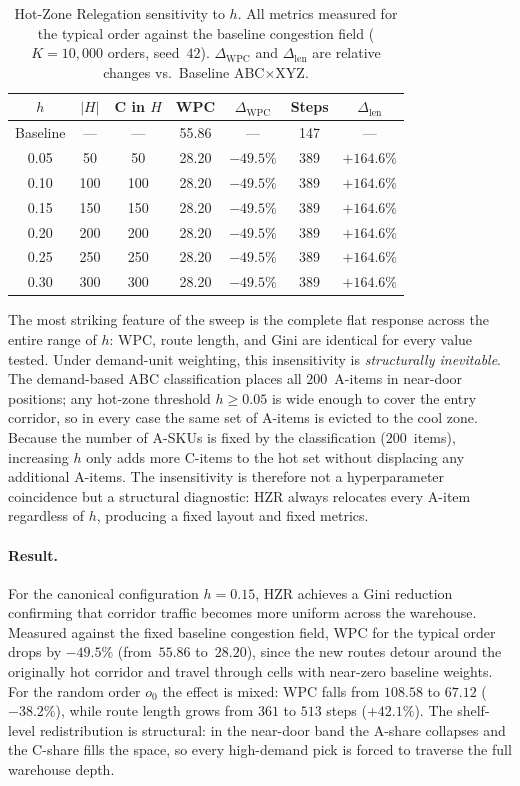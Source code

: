 \documentclass[12pt,a4paper]{article}
\begin{document}
\begin{table}[H]
\centering
\caption{Hot-Zone Relegation sensitivity to $h$.
  All metrics measured for the typical order against the baseline congestion field
  ($K=10{,}000$ orders, seed~$42$).
  $\Delta_\mathrm{WPC}$ and $\Delta_\mathrm{len}$ are relative changes vs.\ Baseline
  ABC$\times$XYZ.}
\label{tab:hzr_sweep}
\renewcommand{\arraystretch}{1.20}
\begin{tabular}{ccccccc}
\hline
$h$ & $|H|$ & C in $H$ & WPC & $\Delta_\mathrm{WPC}$ & Steps & $\Delta_\mathrm{len}$ \\
\hline
Baseline & ---   & ---  & 55.86 & ---         & 147 & ---        \\
0.05     & 50    & 50   & 28.20 & $-49.5\%$   & 389 & $+164.6\%$ \\
0.10     & 100   & 100  & 28.20 & $-49.5\%$   & 389 & $+164.6\%$ \\
0.15     & 150   & 150  & 28.20 & $-49.5\%$   & 389 & $+164.6\%$ \\
0.20     & 200   & 200  & 28.20 & $-49.5\%$   & 389 & $+164.6\%$ \\
0.25     & 250   & 250  & 28.20 & $-49.5\%$   & 389 & $+164.6\%$ \\
0.30     & 300   & 300  & 28.20 & $-49.5\%$   & 389 & $+164.6\%$ \\
\hline
\end{tabular}
\end{table}

The most striking feature of the sweep is the complete flat response across the
entire range of $h$: WPC, route length, and Gini are identical for every value tested.
Under demand-unit weighting, this insensitivity is \emph{structurally inevitable}.
The demand-based ABC classification places all $200$~A-items in near-door positions;
any hot-zone threshold $h \ge 0.05$ is wide enough to cover the entry corridor,
so in every case the same set of A-items is evicted to the cool zone.
Because the number of A-SKUs is fixed by the classification ($200$~items),
increasing $h$ only adds more C-items to the hot set without displacing any
additional A-items.
The insensitivity is therefore not a hyperparameter coincidence but a structural
diagnostic: HZR always relocates every A-item regardless of $h$, producing a
fixed layout and fixed metrics.

\paragraph{Result.}
For the canonical configuration $h = 0.15$, HZR achieves a Gini reduction
confirming that corridor traffic becomes more uniform across the warehouse.
Measured against the fixed baseline congestion field, WPC for the typical
order drops by $-49.5\%$ (from~$55.86$ to~$28.20$), since the new routes
detour around the originally hot corridor and travel through cells with
near-zero baseline weights.
For the random order $o_0$ the effect is mixed: WPC falls from $108.58$
to $67.12$ ($-38.2\%$), while route length grows from $361$ to $513$ steps
($+42.1\%$).
The shelf-level redistribution is structural: in the near-door band the
A-share collapses and the C-share fills the space, so every high-demand
pick is forced to traverse the full warehouse depth.
\end{document}
